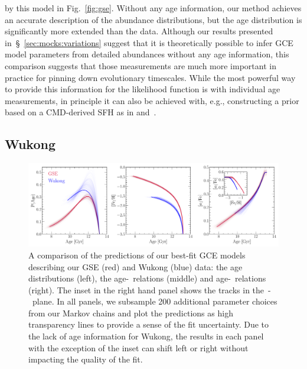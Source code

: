 \documentclass[ms.tex]{subfiles}
\begin{document}
by this model in Fig.~\ref{fig:gse}.
Without any age information, our method achieves an accurate description of the
abundance distributions, but the age distribution is significantly more
extended than the data.
Although our results presented in~\S~\ref{sec:mocks:variations} suggest that it
is theoretically possible to infer GCE model parameters from detailed
abundances without any age information, this comparison suggests that those
measurements are much more important in practice for pinning down evolutionary
timescales.
While the most powerful way to provide this information for the likelihood
function is with individual age measurements, in principle it can also be
achieved with, e.g., constructing a prior based on a CMD-derived SFH as in
\citet{Dolphin2002} and~\citet{Weisz2014b}.

\subsection{Wukong}
\label{sec:h3:wukong}

\begin{figure}
\centering
\includegraphics[scale = 0.45]{gse_wukong_comparison.pdf}
\caption{
A comparison of the predictions of our best-fit GCE models describing our
GSE (red) and Wukong (blue) data: the age distributions (left), the
age-\feh~relations (middle) and age-\afe~relations (right).
The inset in the right hand panel shows the tracks in the~\afe-\feh~plane.
In all panels, we subsample 200 additional parameter choices from our Markov
chains and plot the predictions as high transparency lines to provide a sense
of the fit uncertainty.
Due to the lack of age information for Wukong, the results in each panel with
the exception of the inset can shift left or right without impacting the
quality of the fit.
}
\label{fig:comparison}
\end{figure}
\end{document}

